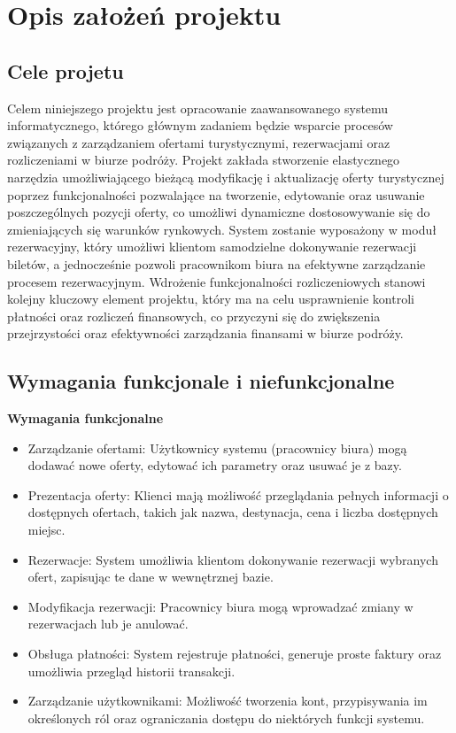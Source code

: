 \chapter{Opis założeń projektu}
\section{Cele projetu}

Celem niniejszego projektu jest opracowanie zaawansowanego systemu informatycznego, którego głównym zadaniem będzie wsparcie procesów związanych z zarządzaniem ofertami turystycznymi, rezerwacjami oraz rozliczeniami w biurze podróży. Projekt zakłada stworzenie elastycznego narzędzia umożliwiającego bieżącą modyfikację i aktualizację oferty turystycznej poprzez funkcjonalności pozwalające na tworzenie, edytowanie oraz usuwanie poszczególnych pozycji oferty, co umożliwi dynamiczne dostosowywanie się do zmieniających się warunków rynkowych.
System zostanie wyposażony w moduł rezerwacyjny, który umożliwi klientom samodzielne dokonywanie rezerwacji biletów, a jednocześnie pozwoli pracownikom biura na efektywne zarządzanie procesem rezerwacyjnym. Wdrożenie funkcjonalności rozliczeniowych stanowi kolejny kluczowy element projektu, który ma na celu usprawnienie kontroli płatności oraz rozliczeń finansowych, co przyczyni się do zwiększenia przejrzystości oraz efektywności zarządzania finansami w biurze podróży.


\section{Wymagania funkcjonale i niefunkcjonalne}

\noindent \textbf{Wymagania funkcjonalne}
\begin{itemize}
    \item Zarządzanie ofertami: Użytkownicy systemu (pracownicy biura) mogą dodawać nowe oferty, edytować ich parametry oraz usuwać je z bazy.
    \item Prezentacja oferty: Klienci mają możliwość przeglądania pełnych informacji o dostępnych ofertach, takich jak nazwa, destynacja, cena i liczba dostępnych miejsc.
    \item Rezerwacje: System umożliwia klientom dokonywanie rezerwacji wybranych ofert, zapisując te dane w wewnętrznej bazie.
    \item Modyfikacja rezerwacji: Pracownicy biura mogą wprowadzać zmiany w rezerwacjach lub je anulować.
    \item Obsługa płatności: System rejestruje płatności, generuje proste faktury oraz umożliwia przegląd historii transakcji.
    \item Zarządzanie użytkownikami: Możliwość tworzenia kont, przypisywania im określonych ról oraz ograniczania dostępu do niektórych funkcji systemu.
\end{itemize}

